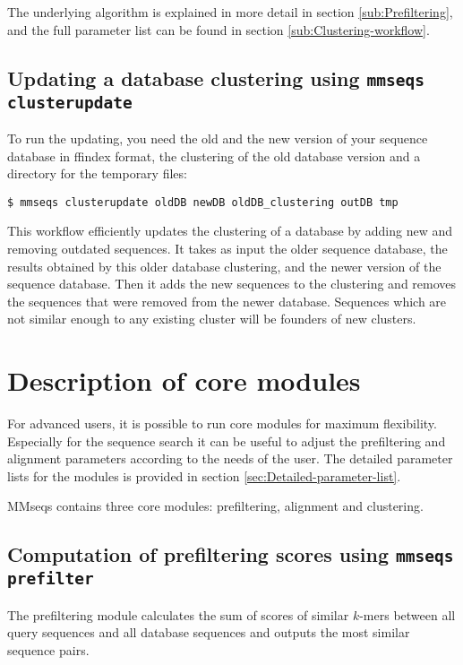 \documentclass[11pt,a4paper]{report}
\begin{document}
The underlying algorithm is explained in more detail in section \ref{sub:Prefiltering},
and the full parameter list can be found in section \ref{sub:Clustering-workflow}.


\subsection{Updating a database clustering using \texttt{mmseqs clusterupdate}}

To run the updating, you need the old and the new version of your
sequence database in ffindex format, the clustering of the old database
version and a directory for the temporary files:

\texttt{\$ mmseqs clusterupdate oldDB newDB oldDB\_clustering outDB tmp}

This workflow efficiently updates the clustering of a database by
adding new and removing outdated sequences. It takes as input the
older sequence database, the results obtained by this older database
clustering, and the newer version of the sequence database. Then it
adds the new sequences to the clustering and removes the sequences
that were removed from the newer database. Sequences which are not
similar enough to any existing cluster will be founders of new clusters.


\section{Description of core modules}

For advanced users, it is possible to run core modules for maximum
flexibility. Especially for the sequence search it can be useful to
adjust the prefiltering and alignment parameters according to the
needs of the user. The detailed parameter lists for the modules is
provided in section \ref{sec:Detailed-parameter-list}.

MMseqs contains\textbf{ }three core modules: prefiltering, alignment
and clustering.


\subsection{Computation of prefiltering scores using \texttt{mmseqs prefilter}\label{sub:Prefiltering}}

The prefiltering module calculates the sum of scores of similar $k$-mers
between all query sequences and all database sequences and outputs
the most similar sequence pairs. 
\end{document}

